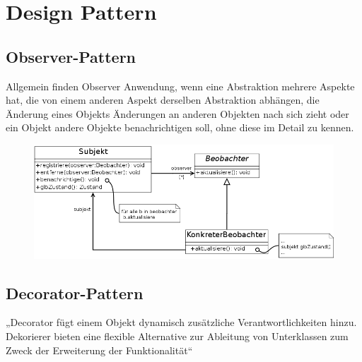 \section{Design Pattern}
\subsection{Observer-Pattern}
Allgemein finden Observer Anwendung, wenn eine Abstraktion mehrere Aspekte hat, die von einem anderen Aspekt derselben Abstraktion abhängen, die Änderung eines Objekts Änderungen an anderen Objekten nach sich zieht oder ein Objekt andere Objekte benachrichtigen soll, ohne diese im Detail zu kennen.

\begin{figure}[H]
\includegraphics[width = 15cm]{mainmatter/pics/Observer.png}
\end{figure}

\subsection{Decorator-Pattern}
„Decorator fügt einem Objekt dynamisch zusätzliche Verantwortlichkeiten hinzu. Dekorierer bieten eine flexible Alternative zur Ableitung von Unterklassen zum Zweck der Erweiterung der Funktionalität“

